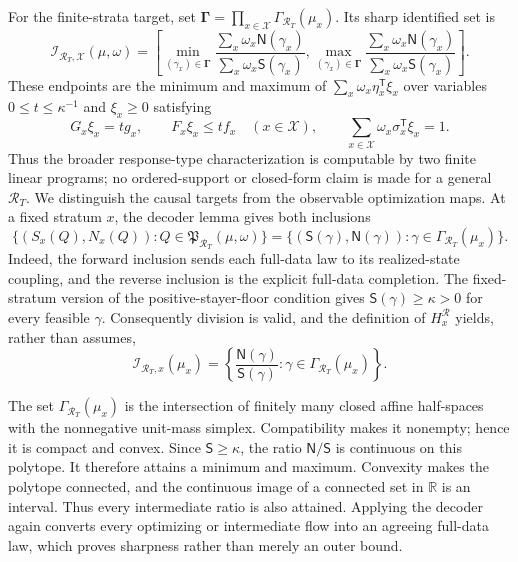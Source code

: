 For the finite-strata target, set \(\boldsymbol\Gamma=\prod_{x\in\mathcal X}\Gamma_{\mathcal R_T}(\mu_x)\).  Its sharp identified set is
\[\mathcal I_{\mathcal R_T,\mathcal X}(\mu,\omega)=\left[
\min_{(\gamma_x)\in\boldsymbol\Gamma}\frac{\sum_x\omega_x\mathsf N(\gamma_x)}{\sum_x\omega_x\mathsf S(\gamma_x)},
\max_{(\gamma_x)\in\boldsymbol\Gamma}\frac{\sum_x\omega_x\mathsf N(\gamma_x)}{\sum_x\omega_x\mathsf S(\gamma_x)}
\right].\]
These endpoints are the minimum and maximum of \(\sum_x\omega_x\eta_x^{\mathsf T}\xi_x\) over variables \(0\le t\le\kappa^{-1}\) and \(\xi_x\ge0\) satisfying
\[G_x\xi_x=tg_x,\qquad F_x\xi_x\le tf_x\quad(x\in\mathcal X),\qquad
  \sum_{x\in\mathcal X}\omega_x\sigma_x^{\mathsf T}\xi_x=1.\]
Thus the broader response-type characterization is computable by two finite linear programs; no ordered-support or closed-form claim is made for a general \(\mathcal R_T\).
We distinguish the causal targets from the observable optimization maps.  At a fixed stratum \(x\), the decoder lemma gives both inclusions
\[\{(S_x(Q),N_x(Q)):Q\in\mathfrak P_{\mathcal R_T}(\mu,\omega)\}
=\{(\mathsf S(\gamma),\mathsf N(\gamma)):\gamma\in\Gamma_{\mathcal R_T}(\mu_x)\}.\]
Indeed, the forward inclusion sends each full-data law to its realized-state coupling, and the reverse inclusion is the explicit full-data completion.  The fixed-stratum version of the positive-stayer-floor condition gives \(\mathsf S(\gamma)\ge\kappa>0\) for every feasible \(\gamma\).  Consequently division is valid, and the definition of \(H_x^{\mathcal R}\) yields, rather than assumes,
\[\mathcal I_{\mathcal R_T,x}(\mu_x)
=\left\{\frac{\mathsf N(\gamma)}{\mathsf S(\gamma)}:\gamma\in\Gamma_{\mathcal R_T}(\mu_x)\right\}.\]

The set \(\Gamma_{\mathcal R_T}(\mu_x)\) is the intersection of finitely many closed affine half-spaces with the nonnegative unit-mass simplex.  Compatibility makes it nonempty; hence it is compact and convex.  Since \(\mathsf S\ge\kappa\), the ratio \(\mathsf N/\mathsf S\) is continuous on this polytope.  It therefore attains a minimum and maximum.  Convexity makes the polytope connected, and the continuous image of a connected set in \(\mathbb R\) is an interval.  Thus every intermediate ratio is also attained.  Applying the decoder again converts every optimizing or intermediate flow into an agreeing full-data law, which proves sharpness rather than merely an outer bound.


